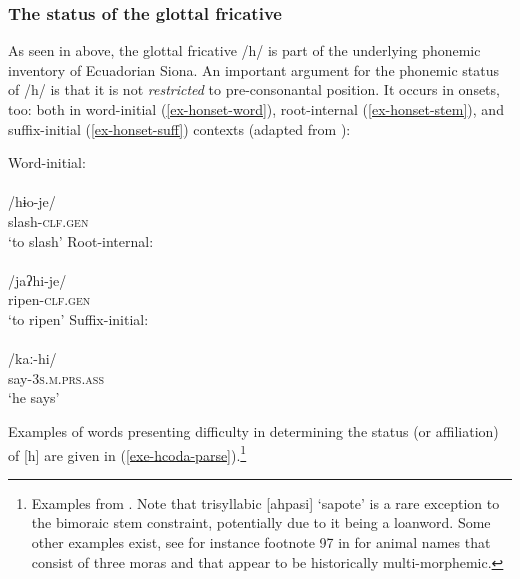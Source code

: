 \documentclass[output=paper]{langscibook}
\begin{document}
\subsubsection{The status of the glottal fricative}\label{sec-glotphon}
As seen in  above, the glottal fricative /h/ is part of the underlying phonemic inventory of Ecuadorian Siona. An important argument for the phonemic status of /h/ is that it is not \emph{restricted} to pre-consonantal position. It occurs in onsets, too: both in word-initial (\ref{ex-honset-word}), root-internal (\ref{ex-honset-stem}), and suffix-initial (\ref{ex-honset-suff}) contexts (adapted from \citealt[102]{Bruil:2014}):

{\multicolsep=0pt\begin{exe}
\ex\label{exe-honset}
\begin{xlist}
\begin{multicols}{3}
\ex\label{ex-honset-word} Word-initial:\\
\glll [{hɨo.je}]\\
/{hɨo-je}/\\
slash-\textsc{clf.gen}\\
\trans `to slash'
\ex\label{ex-honset-stem} Root-internal:\\
\glll [jaʔ.hi.je]	\\
/jaʔhi-je/ \\
ripen-\textsc{clf.gen}\\
\trans `to ripen'
\ex\label{ex-honset-suff}Suffix-initial:\\
\glll [kaː.hi]	\\
/kaː-hi/	\\
say-\textsc{3s.m.prs.ass}\\
\trans `he says'
\end{multicols}
\end{xlist}
\end{exe}}

Examples of words presenting difficulty in determining the status (or affiliation) of [h] are given in (\ref{exe-hcoda-parse}).\footnote{Examples from  \citep[102]{Bruil:2014}. Note that trisyllabic [ahpasi] `sapote' is a rare exception to the bimoraic stem constraint, potentially due to it being a loanword. Some other examples exist, see for instance footnote 97 in \citet[148]{Bruil:2014} for animal names that consist of three moras and that appear to be historically multi-morphemic.}
\end{document}
